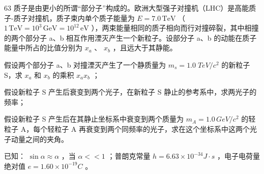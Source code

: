 \begin{problem}[33届物理竞赛复赛]{63}
    质子是由更小的所谓“部分子”构成的。欧洲大型强子对撞机（LHC）是高能质子-质子对撞机，质子束内单个质子能量为 $E = 7.0 \, \text{TeV}$ （ $1\, \text{TeV} = 10^3\, \text{GeV} = 10^{12}\, \text{eV}$ ），两束能量相同的质子相向而行对撞碎裂，其中相撞的两个部分子 a、b 相互作用湮灭产生一个新粒子。设部分子 a、b 的动能在质子能量中所占的比值分别为 $x_a$ 、 $x_b$ ，且远大于其静能。

    \begin{subproblem}
        假设两个部分子 a、b 对撞湮灭产生了一个静质量为 $m_{s}=1.0\;TeV/c^{2}$ 的新粒子 S，求 $x_{a}$ 和 $x_{b}$ 的乘积 $x_{a}x_{b}$ ；
    \end{subproblem}
    \begin{subproblem}
        假设新粒子 S 产生后衰变到两个光子，在新粒子 S 静止的参考系中，求两光子的频率；
    \end{subproblem}
    \begin{subproblem}
        假设新粒子 S 产生后在其静止坐标系中衰变到两个质量为 $m_{A} = 1.0 \, GeV/c^{2}$ 的轻粒子 A，每个轻粒子 A 再衰变到两个同频率的光子，求在这个坐标系中这两个光子动量之间的夹角。
    \end{subproblem}

    已知： $\sin\alpha\approx\alpha$ ，当 $\alpha<<1$ ；普朗克常量 $h=6.63\times10^{-34}J\cdot s$ ，电子电荷量绝对值 $e=1.60\times10^{-19}C$ 。
\end{problem}
